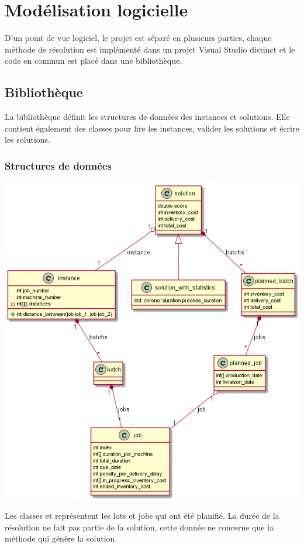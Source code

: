 \section{Modélisation logicielle}

D'un point de vue logiciel, le projet est séparé en plusieurs parties, 
chaque méthode de résolution est implémenté dans un projet Visual Studio distinct et
le code en commun est placé dans une bibliothèque.

\subsection{Bibliothèque}

La bibliothèque définit les structures de données des instances et solutions.
Elle contient également des classes pour lire les instances, valider les solutions et écrire les solutions.

\subsubsection{Structures de données}

\includegraphics[width=\textwidth]{parts/analyse_et_conception/diagramme_data}

Les classes  et  représentent les lots et jobs qui ont été planifié.
La durée de la résolution ne fait pas partie de la solution,  cette donnée ne concerne que la méthode qui génère la solution.

